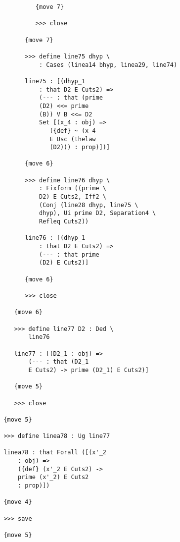 \documentclass[12pt]{article}
\begin{document}
\begin{verbatim}
                        {move 7}

                        >>> close

                     {move 7}

                     >>> define line75 dhyp \
                         : Cases (linea14 bhyp, linea29, line74)

                     line75 : [(dhyp_1 
                         : that D2 E Cuts2) => 
                         (--- : that (prime 
                         (D2) <<= prime 
                         (B)) V B <<= D2 
                         Set [(x_4 : obj) => 
                            ({def} ~ (x_4 
                            E Usc (thelaw 
                            (D2))) : prop)])]

                     {move 6}

                     >>> define line76 dhyp \
                         : Fixform ((prime \
                         D2) E Cuts2, Iff2 \
                         (Conj (line28 dhyp, line75 \
                         dhyp), Ui prime D2, Separation4 \
                         Refleq Cuts2))

                     line76 : [(dhyp_1 
                         : that D2 E Cuts2) => 
                         (--- : that prime 
                         (D2) E Cuts2)]

                     {move 6}

                     >>> close

                  {move 6}

                  >>> define line77 D2 : Ded \
                      line76

                  line77 : [(D2_1 : obj) => 
                      (--- : that (D2_1 
                      E Cuts2) -> prime (D2_1) E Cuts2)]

                  {move 5}

                  >>> close

               {move 5}

               >>> define linea78 : Ug line77

               linea78 : that Forall ([(x'_2 
                   : obj) => 
                   ({def} (x'_2 E Cuts2) -> 
                   prime (x'_2) E Cuts2 
                   : prop)])

               {move 4}

               >>> save

               {move 5}


\end{verbatim}
\end{document}
